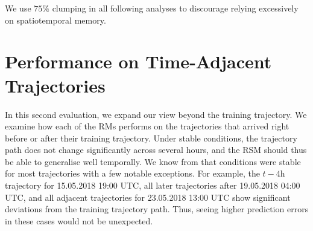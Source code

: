 We use $75\%$ clumping in all following analyses to discourage relying excessively on spatiotemporal memory.

\section{Performance on Time-Adjacent Trajectories} \label{txt:temporal-generalisation}

In this second evaluation, we expand our view beyond the training trajectory. We examine how each of the RMs performs on the trajectories that arrived right before or after their training trajectory. Under stable conditions, the trajectory path does not change significantly across several hours, and the RSM should thus be able to generalise well temporally. We know from  that conditions were stable for most trajectories with a few notable exceptions. For example, the $t-4\text{h}$ trajectory for 15.05.2018 19:00 UTC, all later trajectories after 19.05.2018 04:00 UTC, and all adjacent trajectories for 23.05.2018 13:00 UTC show significant deviations from the training trajectory path. Thus, seeing higher prediction errors in these cases would not be unexpected.

